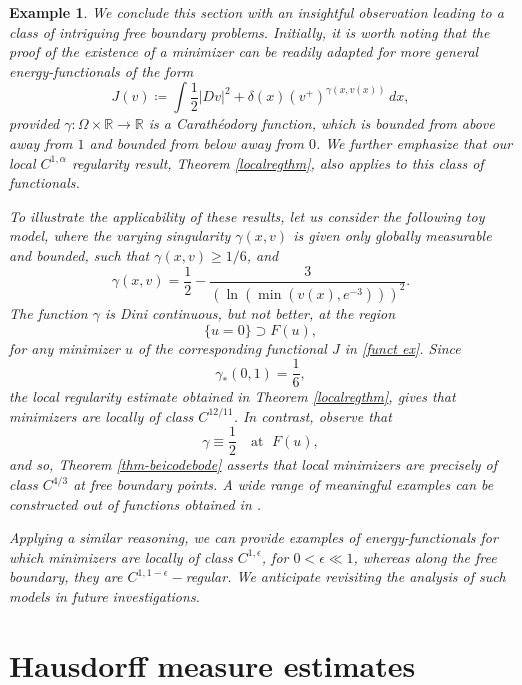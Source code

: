 \documentclass[reqno,11pt]{amsart}
\newtheorem{example}{Example}[section]
\newcommand{\1}{\mathds{1}}
\numberwithin{equation}{section}
\begin{document}
\begin{example} We conclude this section with an insightful observation leading to a class of intriguing free boundary problems. Initially, it is worth noting that the proof of the existence of a minimizer can be readily adapted for more general energy-functionals of the form
\begin{equation}\label{funct ex}
    J(v) \coloneqq \int \frac{1}{2} |Dv|^2 + \delta(x) (v^+)^{\gamma(x, v(x))} \, dx,
\end{equation}
provided $\gamma \colon \Omega \times \mathbb{R} \to \mathbb{R}$ is a Carath\'eodory function, which is bounded from above away from $1$ and bounded from below away from $0$. We further emphasize that our local $C^{1,\alpha}$ regularity result, Theorem \ref{localregthm}, also applies to this class of functionals. 

To illustrate the applicability of these results, let us consider the following toy model, where the varying singularity $\gamma(x,v)$ is given only globally measurable and bounded, such that $\gamma(x,v) \geq 1/6$, and
\begin{equation}
\gamma(x,v)=
\dfrac{1}{2}-\dfrac{3}{(\ln(\min(v(x),e^{-3})))^{2}}.
\end{equation}
The function $\gamma$ is Dini continuous, but not better, at the region
$$\{u = 0\} \supset F(u),$$
for any minimizer $u$ of the corresponding functional $J$ in \eqref{funct ex}. Since
$$
\gamma_\ast(0,1)= \dfrac 16,
$$
the local regularity estimate obtained in Theorem \ref{localregthm}, gives that minimizers are locally of class $C^{12/11}$. In contrast, observe that 
$$
\gamma \equiv \dfrac{1}{2} \quad \text{at } \; F(u),
$$
and so, Theorem \ref{thm-beicodebode} asserts that local minimizers are {\it precisely} of class $C^{4/3}$ at free boundary points. A wide range of meaningful examples can be constructed out of functions obtained in \cite[{\it Section} 2]{APPT}.

Applying a similar reasoning, we can provide examples of energy-function\-als for which minimizers are locally of class $C^{1,\epsilon}$, for $0<\epsilon \ll 1$, whereas along the free boundary, they are $C^{1,1-\epsilon}-$regular. We anticipate revisiting the analysis of such models in future investigations. 
\end{example}

\section{Hausdorff measure estimates}\label{sct Hausdorff}
\end{document}
